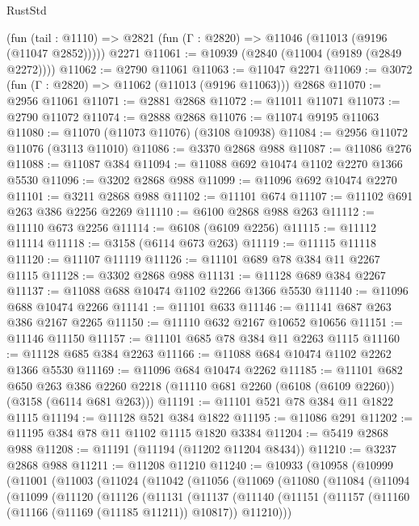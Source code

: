 \begin{lexlean}{RustStd}
\begin{coremodule}
    (fun (tail : @1110) => @2821 (fun (Γ : @2820) => @11046 (@11013 (@9196 (@11047 @2852)))))
    @2271
@11061 := @10939 (@2840 (@11004 (@9189 (@2849 @2272))))
@11062 := @2790 @11061
@11063 := @11047 @2271
@11069 := @3072 (fun (Γ : @2820) => @11062 (@11013 (@9196 @11063))) @2868
@11070 := @2956 @11061
@11071 := @2881 @2868
@11072 := @11011 @11071
@11073 := @2790 @11072
@11074 := @2888 @2868
@11076 := @11074 @9195 @11063
@11080 := @11070 (@11073 @11076) (@3108 @10938)
@11084 := @2956 @11072 @11076 (@3113 @11010)
@11086 := @3370 @2868 @988
@11087 := @11086 @276
@11088 := @11087 @384
@11094 := @11088 @692 @10474 @1102 @2270 @1366 @5530
@11096 := @3202 @2868 @988
@11099 := @11096 @692 @10474 @2270
@11101 := @3211 @2868 @988
@11102 := @11101 @674
@11107 := @11102 @691 @263 @386 @2256 @2269
@11110 := @6100 @2868 @988 @263
@11112 := @11110 @673 @2256
@11114 := @6108 (@6109 @2256)
@11115 := @11112 @11114
@11118 := @3158 (@6114 @673 @263)
@11119 := @11115 @11118
@11120 := @11107 @11119
@11126 := @11101 @689 @78 @384 @11 @2267 @1115
@11128 := @3302 @2868 @988
@11131 := @11128 @689 @384 @2267
@11137 := @11088 @688 @10474 @1102 @2266 @1366 @5530
@11140 := @11096 @688 @10474 @2266
@11141 := @11101 @633
@11146 := @11141 @687 @263 @386 @2167 @2265
@11150 := @11110 @632 @2167 @10652 @10656
@11151 := @11146 @11150
@11157 := @11101 @685 @78 @384 @11 @2263 @1115
@11160 := @11128 @685 @384 @2263
@11166 := @11088 @684 @10474 @1102 @2262 @1366 @5530
@11169 := @11096 @684 @10474 @2262
@11185 := @11101
    @682
    @650
    @263
    @386
    @2260
    @2218
    (@11110 @681 @2260 (@6108 (@6109 @2260)) (@3158 (@6114 @681 @263)))
@11191 := @11101 @521 @78 @384 @11 @1822 @1115
@11194 := @11128 @521 @384 @1822
@11195 := @11086 @291
@11202 := @11195 @384 @78 @11 @1102 @1115 @1820 @3384
@11204 := @5419 @2868 @988
@11208 := @11191 (@11194 (@11202 @11204 @8434))
@11210 := @3237 @2868 @988
@11211 := @11208 @11210
@11240 := @10933
    (@10958
      (@10999
        (@11001
          (@11003
            (@11024
              (@11042
                (@11056
                  (@11069
                    (@11080
                      (@11084
                        (@11094
                          (@11099
                            (@11120
                              (@11126
                                (@11131
                                  (@11137
                                    (@11140
                                      (@11151
                                        (@11157
                                          (@11160 (@11166 (@11169 (@11185 @11211)) @10817))
                                          @11210)))

\end{coremodule}
\end{lexlean}
